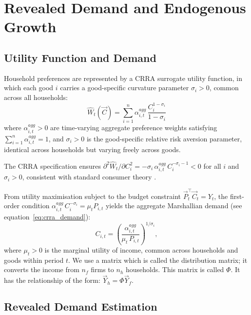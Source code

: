 \section{Revealed Demand and Endogenous Growth}
\label{sec:growth}

\subsection{Utility Function and Demand}

Household preferences are represented by a CRRA surrogate utility
function, in which each good $i$ carries a good-specific curvature
parameter $\sigma_i > 0$, common across all households:
%
\begin{equation}\label{eq:utility}
\hat{W}_t(\vec{C}) = \sum_{i=1}^n \alpha^{agg}_{i,t}
  \,\frac{C_{i}^{1-\sigma_i}}{1-\sigma_i}
\end{equation}
%
where $\alpha^{agg}_{i,t} > 0$ are time-varying aggregate preference
weights satisfying $\sum_{i=1}^{n} \alpha^{agg}_{i,t} = 1$, and
$\sigma_i > 0$ is the good-specific relative risk aversion parameter,
identical across households but varying freely across goods.

\begin{assumption}
The CRRA specification ensures $\partial^2 \hat{W}_t / \partial C_i^2
= -\sigma_i\,\alpha^{agg}_{i,t}\,C_i^{-\sigma_i - 1} < 0$
for all $i$ and $\sigma_i > 0$, consistent with standard consumer
theory \citep{varian1992microeconomic}.
\end{assumption}

From utility maximisation subject to the budget constraint
$\vec{P}_t^\top \vec{C}_t = Y_t$, the first-order condition
$\alpha^{agg}_{i,t}\,C_i^{-\sigma_i} = \mu_t P_{i,t}$ yields the
aggregate Marshallian demand (see equation~\eqref{eq:crra_demand}):
%
\begin{equation}\label{eq:demand}
    C_{i,t} = \left(\frac{\alpha^{agg}_{i,t}}{\mu_t\,P_{i,t}}\right)^{1/\sigma_i},
\end{equation}
%
where $\mu_t > 0$ is the marginal utility of income, common across
households and goods within period $t$. We use a matrix which is
called the distribution matrix; it converts the income from $n_f$
firms to $n_h$ households. This matrix is called $\Phi$. It has the
relationship of the form: $\vec{Y}_{h} = \Phi \vec{Y}_{f}$.


\subsection{Revealed Demand Estimation}

